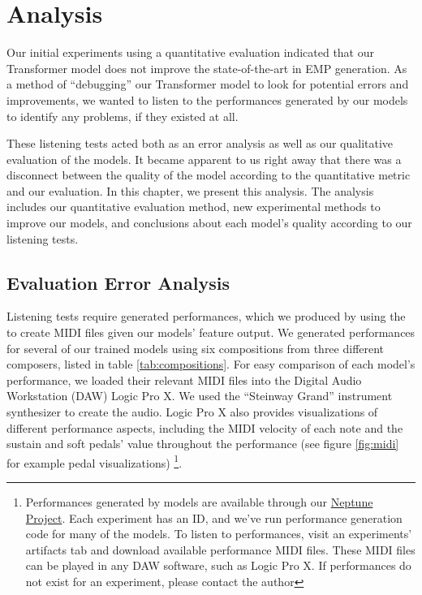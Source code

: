 \chapter{Analysis} \label{ch:ch6}
Our initial experiments using a quantitative evaluation indicated that our Transformer model does not improve the state-of-the-art in EMP generation. As a method of ``debugging'' our Transformer model to look for potential errors and improvements, we wanted to listen to the performances generated by our models to identify any problems, if they existed at all. 

These listening tests acted both as an error analysis as well as our qualitative evaluation of the models. It became apparent to us right away that there was a disconnect between the quality of the model according to the quantitative metric and our evaluation. In this chapter, we present this analysis. The analysis includes our quantitative evaluation method, new experimental methods to improve our models, and conclusions about each model's quality according to our listening tests. 



\section{Evaluation Error Analysis}\label{sec:qualitative-eval-problems}
Listening tests require generated performances, which we produced by using the \vnetf{} to create MIDI files given our models' feature output. We generated performances for several of our trained models using six compositions from three different composers, listed in table \ref{tab:compositions}. For easy comparison of each model's performance, we loaded their relevant MIDI files into the Digital Audio Workstation (DAW) Logic Pro X. We used the ``Steinway Grand'' instrument synthesizer to create the audio. Logic Pro X also provides visualizations of different performance aspects, including the MIDI velocity of each note and the sustain and soft pedals' value throughout the performance (see figure \ref{fig:midi} for example pedal visualizations)%
\footnote{Performances generated by models are available through our \href{https://ui.neptune.ai/richt3211/thesis/experiments}{Neptune Project}. Each experiment has an ID, and we've run performance generation code for many of the models. To listen to performances, visit an experiments' artifacts tab and download available performance MIDI files. These MIDI files can be played in any DAW software, such as Logic Pro X. If performances do not exist for an experiment, please contact the author}. 


